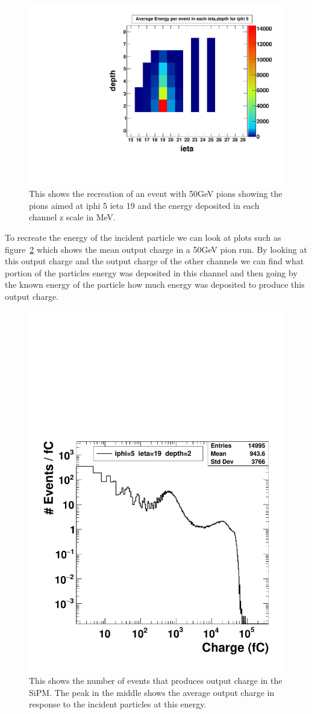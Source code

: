 \begin{figure}
\centering
\includegraphics[width=0.7\linewidth]{Figures/pionrun.pdf}
\caption{This shows the recreation of an event with 50GeV pions showing the pions aimed at iphi 5 ieta 19 and the energy deposited in each channel z scale in MeV.}
\label{fig:pionmap}
\end{figure}

To recreate the energy of the incident particle we can look at plots such as figure~\ref{fig:pioncharge} which shows the mean output charge in a 50GeV pion run. By looking at this output charge and the output charge of the other channels we can find what portion of the particles energy was deposited in this channel and then going by the known energy of the particle how much energy was deposited to produce this output charge. 

\begin{figure}
\centering
\includegraphics[width=0.7\linewidth]{Figures/pioncharge.pdf}
\caption{This shows the number of events that produces output charge in the SiPM. The peak in the middle shows the average output charge in response to the incident particles at this energy.}
\label{fig:pioncharge}
\end{figure}

